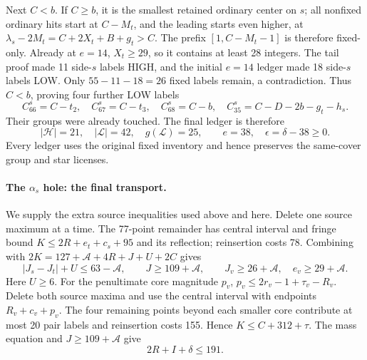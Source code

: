 \documentclass[11pt,letterpaper]{article}
\theoremstyle{definition}\newtheorem{definition}[theorem]{Definition}
\begin{document}
Next $C<b$. If $C\ge b$, it is the smallest retained ordinary center
on $s$; all nonfixed ordinary hits start at $C-M_t$, and the leading
starts even higher, at
$\lambda_s-2M_t=C+2X_t+B+g_t>C$.
The prefix $[1,C-M_t-1]$ is therefore fixed-only.
Already at $e=14$, $X_t\ge29$, so it contains at least 28 integers.
The tail proof made 11 side-$s$ labels HIGH, and the initial $e=14$
ledger made 18 side-$s$ labels LOW. Only $55-11-18=26$ fixed labels
remain, a contradiction. Thus $C<b$, proving four further LOW labels
\[
 C_{66}^s=C-t_2,\quad C_{67}^s=C-t_3,\quad C_{68}^s=C-b,\quad
 C_{35}^s=C-D-2b-g_t-h_s.
\]
Their groups were already touched. The final ledger is therefore
\begin{equation}\label{eq:z5-e38}
 |\mathcal H|=21,\quad |\mathcal L|=42,\quad g(\mathcal L)=25,
 \qquad e=38,\quad\epsilon=\delta-38\ge0.
\end{equation}
Every ledger uses the original fixed inventory and hence preserves the
same-cover group and star licenses.

\paragraph{The $\alpha_s$ hole: the final transport.}
We supply the extra source inequalities used above and here. Delete one
source maximum at a time. The 77-point remainder has central interval
and fringe bound $K\le2R+e_t+c_s+95$ and its reflection; reinsertion
costs 78. Combining with
$2K=127+\mathcal A+4R+J+U+2C$ gives
\[
 |J_s-J_t|+U\le63-\mathcal A,\qquad J\ge109+\mathcal A,
 \qquad J_v\ge26+\mathcal A,\quad e_v\ge29+\mathcal A.
\]
Here $U\ge6$. For the penultimate core magnitude $p_v$,
$p_v\le2r_v-1+\tau_v-R_v$. Delete both source maxima and use the
central interval with endpoints $R_v+c_v+p_v$. The four remaining
points beyond each smaller core contribute at most 20 pair labels and
reinsertion costs 155. Hence $K\le C+312+\tau$.
The mass equation and $J\ge109+\mathcal A$ give
\begin{equation}\label{eq:z5-radial}
 2R+I+\delta\le191.
\end{equation}
\end{document}
